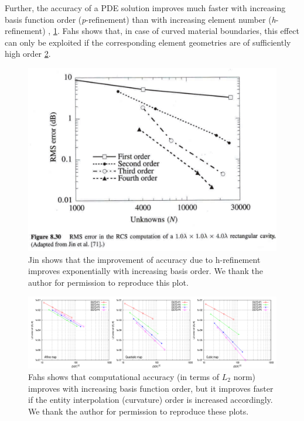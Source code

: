 \noindent
Further, the accuracy of a PDE solution improves much faster with increasing basis function order (\textit{p}-refinement) than with increasing element number (\textit{h}-refinement) \cite{jin2014}, \cref{fig:jin:basisconv}. Fahs \cite{fahs2011} shows that, in case of curved material boundaries, this effect can only be exploited if the corresponding element geometries are of sufficiently high order \cref{fig:fahs:curvconv}.

\begin{figure}
    \centering
    \includegraphics[scale=0.2]{images/jin-tfemim-3ed-fig8-30}
	\captionsetup{width=0.8\textwidth} 
	\caption{ Jin \cite{jin2014} shows that the improvement of accuracy due to h-refinement improves exponentially with increasing basis order. We thank the author for permission to reproduce this plot. }
	\label{fig:jin:basisconv}
\end{figure}

\begin{figure}
    \includegraphics[scale=0.25]{images/fahs-convergence}
	\captionsetup{width=0.8\textwidth} 
	\caption{ Fahs \cite{fahs2011} shows that computational accuracy (in terms of $L_2$ norm) improves with increasing basis function order, but it improves faster if the entity interpolation (curvature) order is increased accordingly. We thank the author for permission to reproduce these plots.}
	\label{fig:fahs:curvconv}
\end{figure}



